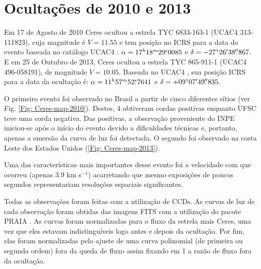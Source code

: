 \documentclass[12pt,a4paper]{report}
\newcommand{\degr}{\ensuremath{^{\circ}}}%
\newcommand{\arcmin}{\ensuremath{^{\prime}}}%
\newcommand{\fs}{\mbox{\ensuremath{.\!\!^s}}}
\newcommand{\farcs}{\mbox{\ensuremath{.\!\!^{\prime\prime}}}}%
\begin{document}
\section{Ocultaç\~oes de 2010 e 2013}
\label{Sec: Ceres-2010-occ}

\indent \indent Em 17 de Agosto de 2010 Ceres ocultou a estrela TYC 6833-163-1 (UCAC4 313-111823), cuja magnitude é $V = 11.55$ e tem posição no ICRS para a data do evento baseada no catálogo UCAC4 \citep{Zacharias2013}: $\alpha = 17^{h}18^{m}29\fs 0085$  e $\delta = -27\degr 26\arcmin 38\farcs 867$. E em 25 de Outubro de 2013, Ceres ocultou a estrela TYC 865-911-1 (UCAC4 496-058191), de magnitude $V = 10.05$. Baseada no UCAC4 \citep{Zacharias2013}, sua posição ICRS para a data da ocultação é: $\alpha = 11^{h}57^{m}52\fs7641$ e $\delta = +09\degr 07\arcmin 49\farcs835$.


\indent O primeiro evento foi observado no Brasil a partir de cinco diferentes sítios (ver Fig. \ref{Fig: Ceres-map-2010}). Destes, 4 obtiveram cordas positivas enquanto UFSC teve uma corda negativa. Das positivas, a observação proveniente do INPE iniciou-se após o início do evento devido a dificuldades técnicas e, portanto, apenas a emersão da curva de luz foi detectada. O segundo foi observado na costa Leste dos Estados Unidos (\ref{Fig: Ceres-map-2013}).

Uma das características mais importantes desse evento foi a velocidade com que ocorreu (apenas 3.9 km s$^{-1}$) acarretando que mesmo exposições de poucos segundos representariam resoluções espaciais significantes.

Todas as observações foram feitas com a utilização de CCDs. As curvas de luz de cada observação foram obtidas das imagens FITS com a utilização do pacote PRAIA \citep[Plataforma de Redução Astrométrica de Imagens Astronômicas,][]{Assafin2011}. As curvas foram normalizadas para o fluxo da estrela mais Ceres, uma vez que eles estavam indistinguíveis logo antes e depois da ocultação. Por fim, elas foram normalizadas pelo ajuste de uma curva polinomial (de primeira ou segunda ordem) fora da queda de fluxo assim fixando em 1 a razão de fluxo fora da ocultação.
\end{document}
